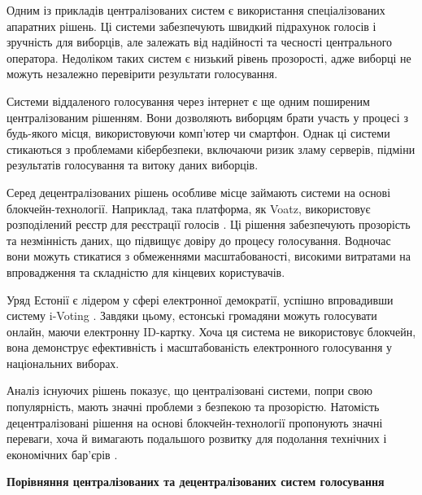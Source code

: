 \documentclass[14pt]{extreport}
\begin{document}
  Одним із прикладів централізованих систем є використання спеціалізованих апаратних рішень. Ці системи забезпечують швидкий підрахунок голосів і зручність для виборців, але залежать від надійності та чесності центрального оператора. Недоліком таких систем є низький рівень прозорості, адже виборці не можуть незалежно перевірити результати голосування.

  Системи віддаленого голосування через інтернет є ще одним поширеним централізованим рішенням. Вони дозволяють виборцям брати участь у процесі з будь-якого місця, використовуючи комп'ютер чи смартфон. Однак ці системи стикаються з проблемами кібербезпеки, включаючи ризик зламу серверів, підміни результатів голосування та витоку даних виборців.

  Серед децентралізованих рішень особливе місце займають системи на основі блокчейн-технології. Наприклад, така платформа, як Voatz, використовує розподілений реєстр для реєстрації голосів \cite{voatz}. Ці рішення забезпечують прозорість та незмінність даних, що підвищує довіру до процесу голосування. Водночас вони можуть стикатися з обмеженнями масштабованості, високими витратами на впровадження та складністю для кінцевих користувачів.

  Уряд Естонії є лідером у сфері електронної демократії, успішно впровадивши систему i-Voting \cite{ivoting}. Завдяки цьому, естонські громадяни можуть голосувати онлайн, маючи електронну ID-картку. Хоча ця система не використовує блокчейн, вона демонструє ефективність і масштабованість електронного голосування у національних виборах.

  Аналіз існуючих рішень показує, що централізовані системи, попри свою популярність, мають значні проблеми з безпекою та прозорістю. Натомість децентралізовані рішення на основі блокчейн-технології пропонують значні переваги, хоча й вимагають подальшого розвитку для подолання технічних і економічних бар'єрів \cite{ieee:almeida}.
  
  \begin{table}[H]
  \centering
  \renewcommand{\tablename}{Таблиця}
  \renewcommand{\thetable}{\thechapter.\arabic{table}.}
  \caption{}
  \textbf{Порівняння централізованих та децентралізованих систем голосування\vspace{5pt}}
  \label{tab:voting_systems_comparison}
  \end{table}
  
\end{document}
